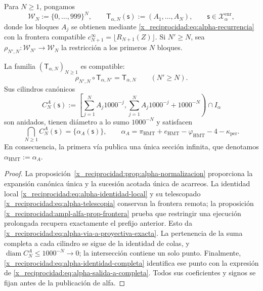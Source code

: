 Para \(N\geq1\), pongamos
\[
 \mathcal W_N:=\{0,\ldots,999\}^{N},
 \qquad
 \mathsf T_{\alpha,N}(\mathsf s):=(A_1,\ldots,A_N),
 \qquad \mathsf s\in\mathcal X_{\alpha}^{\mathrm{enr}},
\]
donde los bloques \(A_j\) se obtienen mediante
\eqref{x_reciprocidad:eq:alpha-recurrencia} con la frontera compatible
\(c_{N+1}^{\infty}=\lfloor R_{N+1}(Z)\rfloor\). Si \(N'\geq N\), sea
\(\rho_{N',N}:\mathcal W_{N'}\to\mathcal W_N\) la restricción a los
primeros \(N\) bloques.

\begin{theorem}
\label{x_reciprocidad:thm:alpha-salida-dodecafasica-completa}
La familia \((\mathsf T_{\alpha,N})_{N\geq1}\) es compatible:
\begin{equation}
 \rho_{N',N}\circ\mathsf T_{\alpha,N'}
 =\mathsf T_{\alpha,N}
 \qquad(N'\geq N).
 \label{x_reciprocidad:eq:alpha-via-a-proyectiva-exacta}
\end{equation}
Sus cilindros canónicos
\begin{equation}
 C_N^A(\mathsf s):=
 \left[
  \sum_{j=1}^{N}A_j1000^{-j},
  \sum_{j=1}^{N}A_j1000^{-j}+1000^{-N}
 \right)\cap I_\alpha
 \label{x_reciprocidad:eq:alpha-cilindros-via-a-exactos}
\end{equation}
son anidados, tienen diámetro a lo sumo \(1000^{-N}\) y satisfacen
\begin{equation}
 \bigcap_{N\geq1}C_N^A(\mathsf s)
 =\{\alpha_A(\mathsf s)\},
 \qquad
 \alpha_A
 =\pi_{\mathrm{HMT}}+e_{\mathrm{HMT}}-\varphi_{\mathrm{HMT}}
  -4-\kappa_{\mathrm{per}}.
 \label{x_reciprocidad:eq:alpha-salida-a-completa}
\end{equation}
En consecuencia, la primera vía publica una única sección infinita, que
denotamos \(\alpha_{\mathrm{HMT}}:=\alpha_A\).
\end{theorem}

\begin{proof}
La proposición~\ref{x_reciprocidad:prop:alpha-normalizacion} proporciona la expansión
canónica única y la sucesión acotada única de acarreos. La identidad local
\eqref{x_reciprocidad:eq:alpha-identidad-local} y su telescopado
\eqref{x_reciprocidad:eq:alpha-telescopia} conservan la frontera remota; la proposición
\ref{x_reciprocidad:ampl-alfa-prop-frontera} prueba que restringir una ejecución prolongada
recupera exactamente el prefijo anterior. Esto da
\eqref{x_reciprocidad:eq:alpha-via-a-proyectiva-exacta}. La pertenencia de la suma completa
a cada cilindro se sigue de la identidad de colas, y
\(\operatorname{diam}C_N^A\leq1000^{-N}\to0\); la intersección contiene un
solo punto. Finalmente, \eqref{x_reciprocidad:eq:alpha-identidad-completa} identifica ese
punto con la expresión de \eqref{x_reciprocidad:eq:alpha-salida-a-completa}. Todos sus
coeficientes y signos se fijan antes de la publicación de alfa.
\end{proof}

